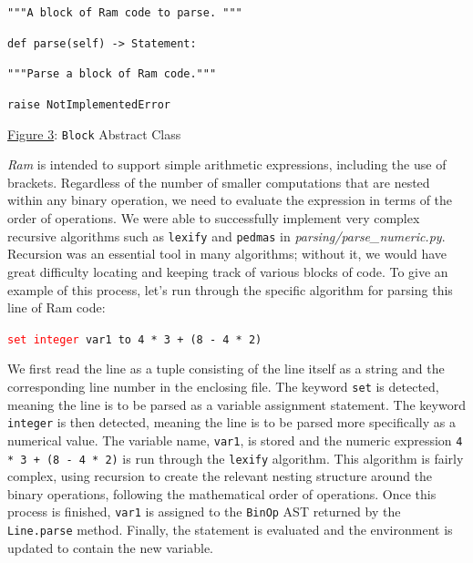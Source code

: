 \documentclass[11pt]{article}
\newcommand{\red}[1]{\textcolor{red}{#1}}
\begin{document}
\quad \quad\quad \texttt{\textcolor{commentblue}{"""A block of Ram code to parse. """}}

\quad \quad\quad\texttt{\textcolor{keywordred}{def} \textcolor{keywordpurple}{parse}(self) -> Statement:}
    
\quad \quad\quad \texttt{\textcolor{commentblue}{"""Parse a block of Ram code."""}}
    
\quad \quad\quad \quad\quad \texttt{\textcolor{keywordred}{raise} \textcolor{keywordorange}{NotImplementedError}}

\bigskip

\begin{center}

    \small{\hyperlink{fig3}{Figure 3}: \texttt{Block} Abstract Class}
\end{center}

\newpage

\emph{Ram} is intended to support simple arithmetic expressions, including the use of brackets. Regardless of the number of smaller computations that are nested within any binary operation, we need to evaluate the expression in terms of the order of operations. We were able to successfully implement very complex recursive algorithms such as \texttt{lexify} and \texttt{pedmas} in \textit{parsing/parse\_numeric.py}. Recursion was an essential tool in many algorithms; without it, we would have great difficulty locating and keeping track of various blocks of code. To give an example of this process, let's run through the specific algorithm for parsing this line of Ram code:

\begin{center}
    \texttt{\red{set integer} var1 to 4 * 3 + (8 - 4 * 2)}
\end{center}

We first read the line as a tuple consisting of the line itself as a string and the corresponding line number in the enclosing file. The keyword \texttt{set} is detected, meaning the line is to be parsed as a variable assignment statement. The keyword \texttt{integer} is then detected, meaning the line is to be parsed more specifically as a numerical value. The variable name, \texttt{var1}, is stored and the numeric expression \texttt{4 * 3 + (8 - 4 * 2)} is run through the \texttt{lexify} algorithm. This algorithm is fairly complex, using recursion to create the relevant nesting structure around the binary operations, following the mathematical order of operations. Once this process is finished, \texttt{var1} is assigned to the \texttt{BinOp} AST returned by the \texttt{Line.parse} method. Finally, the statement is evaluated and the environment is updated to contain the new variable.
\end{document}

